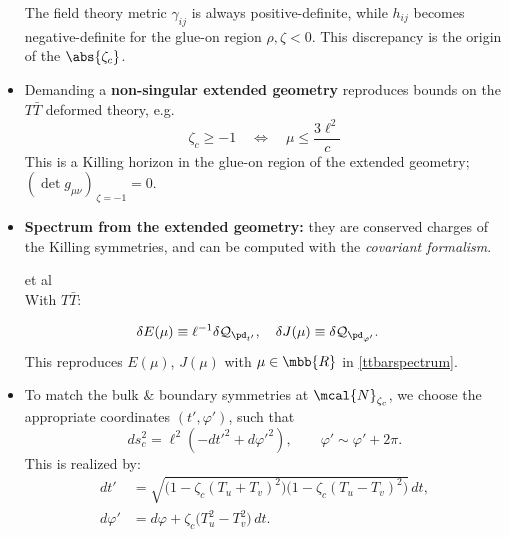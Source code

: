 \documentclass[10pt]{article}
\newcommand{\citations}[1]{{\footnotesize#1\par}}
\newcommand{\TTbar}{\texorpdfstring{\ensuremath{T\bar{T}}}{TTbar}\xspace}
\begin{document}
\begin{multicols}{3}
\begin{itemize}
	The field theory metric $\gamma_{ij}$ is always positive-definite, while $h_{ij}$ becomes negative-definite for the glue-on region $\rho,\zeta < 0$.
	This discrepancy is the origin of the $\abs{\zeta_c}$.

%
%

\item Demanding a \textbf{non-singular extended geometry} reproduces bounds on the \TTbar deformed theory, e.g.
	\begin{equation}
		\zeta_c \ge -1 \quad \Leftrightarrow \quad\mu\le \frac{ 3\ell^2 }{c} \label{reality}
	\end{equation}
	This is a Killing horizon in the glue-on region of the \mbox{extended} geometry;
	$(\det g_{\mu\nu})_{\,\zeta = -1} = 0$.

\item \textbf{Spectrum from the extended geometry:} they are \mbox{conserved} charges of the Killing symmetries, and can be computed with the \textit{covariant formalism}.

\citations{
	\textsl{\citeauthor{Iyer:1994ys,Barnich:2001jy}} et al\\
	With \TTbar: \textcite{Kraus:2021cwf}
}\vspace{-1.5\baselineskip}
	\begin{align*}
		\delta E(\mu) &\equiv  \ell^{-1} \delta \mathcal Q_{\pd_{t'}}, \quad \delta J(\mu) \equiv  \delta \mathcal Q_{\pd_{\varphi'}}.
	\end{align*}
	This reproduces $E(\mu)$, $J(\mu)$ with $\mu \in\mbb{R}$ in \eqref{ttbarspectrum}.

\columnbreak

\vspace*{-8\baselineskip}

	\item To match the bulk \& boundary symmetries at $\mcal{N}_{\zeta_c}$, we choose the appropriate coordinates $(t',\varphi')$, such that
	\begin{equation}
		ds^2_c = \ell^2 ( -dt'^2 + d\varphi'^2) , \qquad \varphi' \sim \varphi' + 2\pi.\label{cutoffmetric}
	\end{equation}
This is realized by:
	\begin{align*}
		dt' &= \sqrt{ \big(1 - \zeta_c (T_u+T_v)^2 \big) \big(1 - \zeta_c (T_u-T_v)^2 \big) } \, dt,  \\
		 d\varphi' &= d\varphi + \zeta_c \big( T_u^2 - T_v^2 \big)\,dt.
	\end{align*}


\end{itemize}
\end{multicols}
\end{document}
